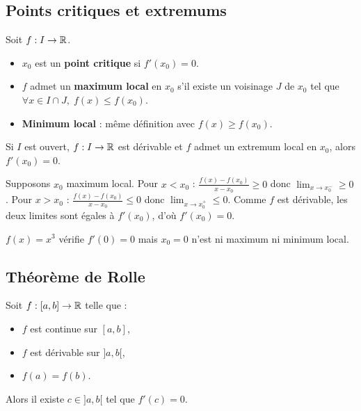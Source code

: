 \subsection{Points critiques et extremums}

\begin{defbox}
Soit $f : I \to \mathbb{R}$.
\begin{itemize}[leftmargin=1cm]
  \item $x_0$ est un \textbf{point critique} si $f'(x_0) = 0$.
  \item $f$ admet un \textbf{maximum local} en $x_0$ s'il existe un voisinage $J$ de $x_0$ tel que $\forall x \in I \cap J, \; f(x) \leqslant f(x_0)$.
  \item \textbf{Minimum local} : même définition avec $f(x) \geqslant f(x_0)$.
\end{itemize}
\end{defbox}

\begin{thmbox}
Si $I$ est ouvert, $f : I \to \mathbb{R}$ est dérivable et $f$ admet un extremum local en $x_0$, alors $f'(x_0) = 0$.
\end{thmbox}

\begin{proofbox}
Supposons $x_0$ maximum local. Pour $x < x_0$ : $\frac{f(x) - f(x_0)}{x - x_0} \geqslant 0$ donc $\lim_{x \to x_0^-} \geqslant 0$. Pour $x > x_0$ : $\frac{f(x) - f(x_0)}{x - x_0} \leqslant 0$ donc $\lim_{x \to x_0^+} \leqslant 0$. Comme $f$ est dérivable, les deux limites sont égales à $f'(x_0)$, d'où $f'(x_0) = 0$.
\end{proofbox}

\begin{rembox}
$f(x) = x^3$ vérifie $f'(0) = 0$ mais $x_0 = 0$ n'est ni maximum ni minimum local.
\end{rembox}

\subsection{Théorème de Rolle}

\begin{thmbox}
Soit $f : [a, b] \to \mathbb{R}$ telle que :
\begin{itemize}[leftmargin=1cm]
  \item $f$ est continue sur $[a, b]$,
  \item $f$ est dérivable sur $]a, b[$,
  \item $f(a) = f(b)$.
\end{itemize}
Alors il existe $c \in ]a, b[$ tel que $f'(c) = 0$.
\end{thmbox}

